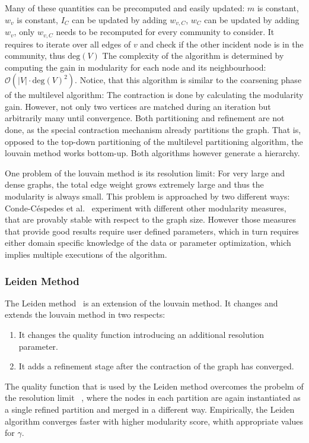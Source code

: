                 Many of these quantities can be precomputed and easily updated:
                $m$ is constant, $w_v$ is constant, $I_C$ can be updated by adding $w_{v, C}$, $w_C$ can be updated by adding $w_v$, only $w_{v, C}$ needs to be recomputed for every community to consider. 
                It requires to iterate over all edges of $v$ and check if the other incident node is in the community, thus $\text{deg}(V)$
                The complexity of the algorithm is determined by computing the gain in modularity for each node and its neighbourhood: $\mathcal{O}(|V| \cdot \text{deg}(V)^2)$.
                Notice, that this algorithm is similar to the coarsening phase of the multilevel algorithm: 
                The contraction is done by calculating the modularity gain.
                However, not only two vertices are matched during an iteration but arbitrarily many until convergence. 
                Both partitioning and refinement are not done, as the special contraction mechanism already partitions the graph.
                That is, opposed to the top-down partitioning of the multilevel partitioning algorithm, the louvain method works bottom-up.
                Both algorithms however generate a hierarchy.
                
                One problem of the louvain method is its resolution limit:
                For very large and dense graphs, the total edge weight grows extremely large and thus the modularity is always small.
                This problem is approached by two different ways:
                Conde-C{\'e}spedes et al.~\autocite{conde2017comparison} experiment with different other modularity measures, that are provably stable with respect to the graph size.
                However those measures that provide good results require user defined parameters, which in turn requires either domain specific knowledge of the data or parameter optimization, which implies multiple executions of the algorithm. 
                
            \subsubsection*{Leiden Method}
                The Leiden method~\autocite{traag2019louvain} is an extension of the louvain method.
                It changes and extends the louvain method in two respects:
                \begin{enumerate}
                 \item It changes the quality function introducing an additional resolution parameter.
                 \item It adds a refinement stage after the contraction of the graph has converged.
                \end{enumerate}
                The quality function that is used by the Leiden method overcomes the probelm of the resolution limit~\autocite{traag2011narrow, potts1952some, }
                , where the nodes in each partition are again instantiated as a single refined partition and merged in a different way. 
                Empirically, the Leiden algorithm converges faster with higher modularity score, whith appropriate values for $\gamma$.
                
            

 

